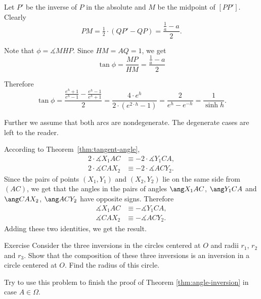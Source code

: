 Let $P'$ be the inverse of $P$ in the absolute
and $M$ be the midpoint of $[PP']$.
Clearly 
$$PM=\tfrac12\cdot(QP'-QP)=\frac{\frac1a-a}{2}.$$

Note that $\phi=\measuredangle MHP$.
Since $HM=AQ=1$, we get
$$\tan\phi=\frac{MP}{HM}=\frac{\frac1a-a}{2}$$


Therefore
$$\tan \phi
=\frac{\frac{e^h+1}{e^h-1}-\frac{e^h-1}{e^h+1}}2
=\frac{4\cdot e^{h}}{2\cdot( e^{2\cdot h}-1)}
=\frac{2}{e^{h}-e^{-h}}=\frac1{\sinh h}.$$
\qedsf












Further we assume that both arcs are nondegenerate.
The degenerate cases are left to the reader.

According to Theorem~\ref{thm:tangent-angle},
\begin{align*}
2\cdot \measuredangle X_1AC
&\equiv -2\cdot \measuredangle Y_1CA,
\\
2\cdot \measuredangle CAX_2
&\equiv -2\cdot \measuredangle ACY_2.
\end{align*}
Since the pairs of points $(X_1, Y_1)$ and $(X_2, Y_2)$
lie on the same side from $(AC)$,
we get that the  angles in the pairs of angles 
$\ang X_1AC$, $\ang Y_1CA$ 
and $\ang CAX_2$, $\ang ACY_2$
have opposite signs.
Therefore 
\begin{align*}
\measuredangle X_1AC
&\equiv - \measuredangle Y_1CA,
\\
 \measuredangle CAX_2
&\equiv - \measuredangle ACY_2.
\end{align*}
Adding these two identities, we get the result.
\qeds








\begin{thm}{Exercise}\label{ex:3-inverions}
Consider the three inversions
in the circles centered at $O$ and radii $r_1$, $r_2$ and $r_3$.
Show that the composition of these three inversions is an inversion in a circle centered at $O$.
Find the radius of this circle.

Try to use this problem to finish the proof of Theorem \ref{thm:angle-inversion} in case $A\in\Omega$.
\end{thm}







